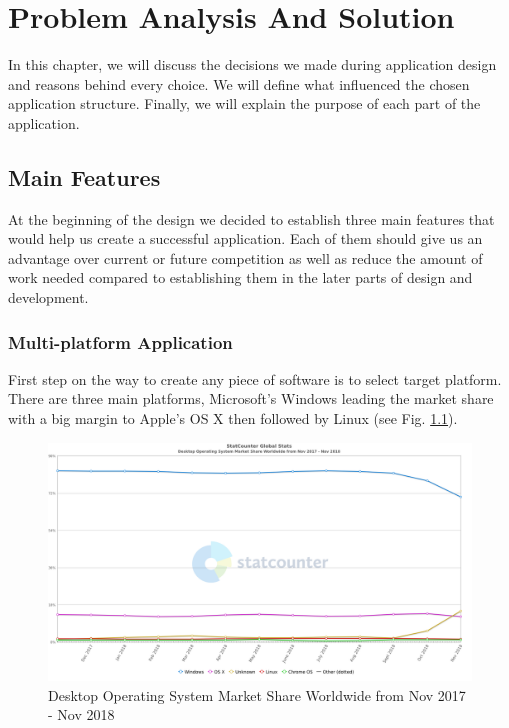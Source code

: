 \chapter{Problem Analysis And Solution}

In this chapter, we will discuss the decisions we made during application design and reasons behind every choice. We will define what influenced the chosen application structure. Finally, we will explain the purpose of each part of the application.

\section{Main Features}
At the beginning of the design we decided to establish three main features that would help us create a successful application. Each of them should give us an advantage over current or future competition as well as reduce the amount of work needed compared to establishing them in the later parts of design and development.

\subsection{Multi-platform Application}

First step on the way to create any piece of software is to select target platform. There are three main platforms, Microsoft's Windows leading the market share with a big margin to Apple's OS X then followed by Linux (see Fig. \ref{fig01:osMarketShareChart}).

\begin{figure}[h]\centering
\includegraphics[width=1.0\textwidth]{img/StatCounter-os_combined-ww-monthly-201711-201811}
\caption{Desktop Operating System Market Share Worldwide from Nov 2017 - Nov 2018~\citep{osMarketShare}}
\label{fig01:osMarketShareChart}
\end{figure}

